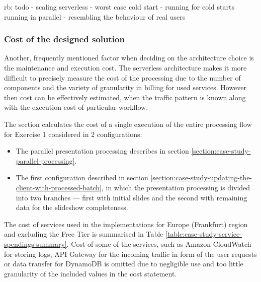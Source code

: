 rb: todo - scaling serverless - worst case cold start - running for cold starts running in parallel - resembling the behaviour of real users

\subsubsection{Cost of the designed solution}

Another, frequently mentioned factor when deciding on the architecture choice is the maintenance and execution cost. The serverless architecture makes it more difficult to precisely measure the cost of the processing due to the number of components and the variety of granularity in billing for used services. However then cost can be effectively estimated, when the traffic pattern is known along with the execution cost of particular workflow.

The section calculates the cost of a single execution of the entire processing flow for Exercise 1 considered in 2 configurations:

\begin{itemize}
   \item The parallel presentation processing describes in section \ref{section:case-study-parallel-processing}.
   \item The first configuration described in section \ref{section:case-study-updating-the-client-with-processed-batch}, in which the presentation processing is divided into two branches --- first with initial slides and the second with remaining data for the slideshow completeness.
\end{itemize}

The cost of services used in the implementations for Europe (Frankfurt) region and excluding the Free Tier is summarised in Table \ref{table:case-study-service-spendings-summary}. Cost of some of the services, such as Amazon CloudWatch for storing logs, API Gateway for the incoming traffic in form of the user requests or data transfer for DynamoDB is omitted due to negligible use and too little granularity of the included values in the cost statement.

